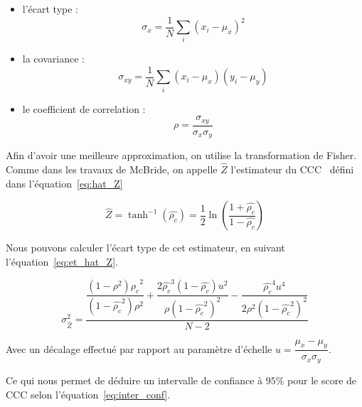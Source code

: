 \begin{itemize}
  \item l'écart type :
  \begin{equation}
      \sigma_x = \dfrac{1}{N} \sum_{i} \left(x_i - \mu_x\right)^2
  \end{equation}

  \item la covariance :
  \begin{equation}
    \sigma_{xy} = \dfrac{1}{N} \sum_{i} \left(x_i - \mu_x\right)\left(y_i - \mu_y\right)
  \end{equation}

  \item le coefficient de correlation :
  \begin{equation}
    \rho = \dfrac{\sigma_{xy}}{\sigma_{x} \sigma_{y} }
  \end{equation}
\end{itemize}

Afin d'avoir une meilleure approximation, on utilise la transformation de Fisher. Comme dans les travaux de McBride, on appelle $\hat{Z}$ l'estimateur du CCC~\cite{McBride2005} défini dans l'équation~\ref{eq:hat_Z}

\begin{equation}
  \hat{Z} = \tanh^{-1}(\hat{\rho_c}) =  \dfrac{1}{2} \ln \left( \dfrac{1+ \hat{\rho_c} }{1 -\hat{\rho_c}}  \right)
  \label{eq:hat_Z}
\end{equation}

Nous pouvons calculer l'écart type de cet estimateur, en suivant l'équation~\ref{eq:et_hat_Z}.

\begin{equation}
\sigma_{\hat{Z} }^2 = \dfrac{\dfrac{(1-\rho^2) \hat{\rho_c} ^2}{(1-\hat{\rho_c}^2)\rho^2 } +  \dfrac{2\hat{\rho_c} ^3(1-\hat{\rho_c} )u^2}{\rho(1-\hat{\rho_c} ^2)^2} - \dfrac{\hat{\rho_c}^4 u^4}{2 \rho^2 (1-\hat{\rho_c}^2 )^2}}{N-2}
\label{eq:et_hat_Z}
\end{equation}

Avec un décalage effectué par rapport au paramètre d'échelle $u = \dfrac{\mu_x - \mu_y}{\sigma_x \sigma_y}$.

Ce qui nous permet de déduire un intervalle de confiance à $95\%$ pour le score de CCC selon l'équation~\ref{eq:inter_conf}.

\begin{equation}
    [\tanh (\hat{Z} - 1.64 \sigma_{\hat{Z}}); \tanh(\hat{Z} + 1.64 \sigma_{\hat{Z}})]
    \label{eq:inter_conf}
\end{equation}

